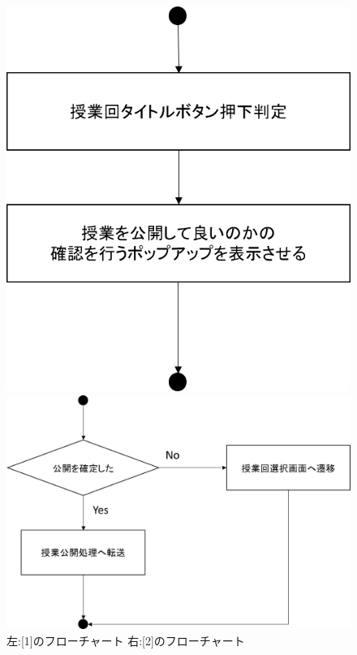 \begin{figure}[htbp]
 \begin{minipage}{0.5\hsize}
  \begin{center}
   \includegraphics[width=0.45\linewidth,clip]{./img/start_lecture/sub1.png}
  \end{center}
 \end{minipage}
 \begin{minipage}{0.5\hsize}
  \begin{center}
   \includegraphics[width=1\linewidth,clip]{./img/start_lecture/sub2.png}
  \end{center}
 \end{minipage}
 \caption{左:[1]のフローチャート 右:[2]のフローチャート}\label{fig:startlectureflow0}
\end{figure}

